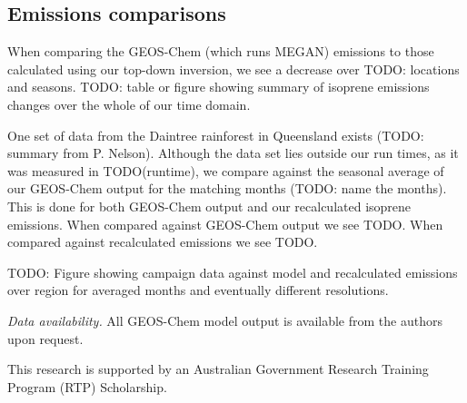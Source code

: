 \documentclass[acp, manuscript]{copernicus} %
\begin{document}
  \subsection{Emissions comparisons}
    
    When comparing the GEOS-Chem (which runs MEGAN) emissions to those calculated using our top-down inversion, we see a decrease over TODO: locations and seasons.
    TODO: table or figure showing summary of isoprene emissions changes over the whole of our time domain.
    
    One set of data from the Daintree rainforest in Queensland exists (TODO: summary from P. Nelson).
    Although the data set lies outside our run times, as it was measured in TODO(runtime), we compare against the seasonal average of our GEOS-Chem output for the matching months (TODO: name the months).
    This is done for both GEOS-Chem output and our recalculated isoprene emissions.
    When compared against GEOS-Chem output we see TODO.
    When compared against recalculated emissions we see TODO.
    
    TODO: Figure showing campaign data against model and recalculated emissions over region for averaged months and eventually different resolutions.
    
    
    
\conclusions  %


\appendix

\appendixfigures  %
\appendixtables   %

\authorcontribution{}



%
\textit{Data availability.} All GEOS-Chem model output is available from the authors upon request.

\begin{acknowledgements}
This research is supported by an Australian Government Research Training Program (RTP) Scholarship.
\end{acknowledgements}



\end{document}
